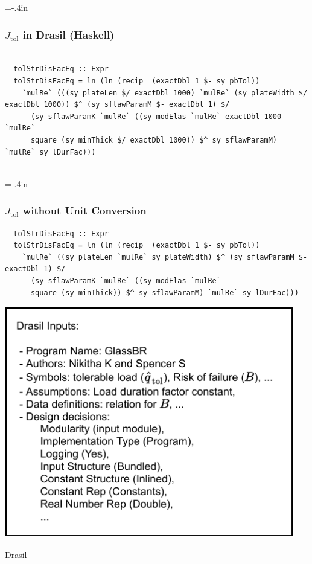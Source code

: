 \documentclass[usenames,dvipsnames]{beamer}
\begin{document}
\hoffset=0in %
\hoffset=-.4in %
\begin{frame}
  
  \frametitle{$J_{\mbox{tol}}$ in Drasil (Haskell)}
  
  \begin{lstlisting}
  
  tolStrDisFacEq :: Expr
  tolStrDisFacEq = ln (ln (recip_ (exactDbl 1 $- sy pbTol))
    `mulRe` (((sy plateLen $/ exactDbl 1000) `mulRe` (sy plateWidth $/ exactDbl 1000)) $^ (sy sflawParamM $- exactDbl 1) $/
      (sy sflawParamK `mulRe` ((sy modElas `mulRe` exactDbl 1000 `mulRe`
      square (sy minThick $/ exactDbl 1000)) $^ sy sflawParamM) `mulRe` sy lDurFac)))
  
  \end{lstlisting}
\end{frame}
\hoffset=0in %
\hoffset=-.4in %
\begin{frame}
  
  \frametitle{$J_{\mbox{tol}}$ without Unit Conversion}
  
  \begin{lstlisting}
  tolStrDisFacEq :: Expr
  tolStrDisFacEq = ln (ln (recip_ (exactDbl 1 $- sy pbTol))
    `mulRe` ((sy plateLen `mulRe` sy plateWidth) $^ (sy sflawParamM $- exactDbl 1) $/
      (sy sflawParamK `mulRe` ((sy modElas `mulRe`
      square (sy minThick)) $^ sy sflawParamM) `mulRe` sy lDurFac)))
  \end{lstlisting}
\end{frame}
\hoffset=0in %
  
\begin{frame}
  
  
  \includegraphics[width=0.95\textwidth]{DrasilInputs.pdf}
  
  \href{https://github.com/JacquesCarette/Drasil}{Drasil}
  \citep{CaretteEtAl2021-Drasil}

\end{frame}
  
\end{document}
